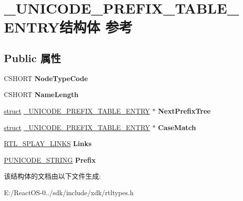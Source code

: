 \hypertarget{struct___u_n_i_c_o_d_e___p_r_e_f_i_x___t_a_b_l_e___e_n_t_r_y}{}\section{\+\_\+\+U\+N\+I\+C\+O\+D\+E\+\_\+\+P\+R\+E\+F\+I\+X\+\_\+\+T\+A\+B\+L\+E\+\_\+\+E\+N\+T\+R\+Y结构体 参考}
\label{struct___u_n_i_c_o_d_e___p_r_e_f_i_x___t_a_b_l_e___e_n_t_r_y}
\subsection*{Public 属性}
\begin{DoxyCompactItemize}
\item 
\mbox{\label{struct___u_n_i_c_o_d_e___p_r_e_f_i_x___t_a_b_l_e___e_n_t_r_y_aef9dc6897e15fdf522d035b4da75b87a}} 
C\+S\+H\+O\+RT {\bfseries Node\+Type\+Code}
\item 
\mbox{\label{struct___u_n_i_c_o_d_e___p_r_e_f_i_x___t_a_b_l_e___e_n_t_r_y_a8d2609fad02d784224161b183a04c645}} 
C\+S\+H\+O\+RT {\bfseries Name\+Length}
\item 
\mbox{\label{struct___u_n_i_c_o_d_e___p_r_e_f_i_x___t_a_b_l_e___e_n_t_r_y_a84e2cee2bf7b9b90da85844608087127}} 
\hyperlink{interfacestruct}{struct} \hyperlink{struct___u_n_i_c_o_d_e___p_r_e_f_i_x___t_a_b_l_e___e_n_t_r_y}{\+\_\+\+U\+N\+I\+C\+O\+D\+E\+\_\+\+P\+R\+E\+F\+I\+X\+\_\+\+T\+A\+B\+L\+E\+\_\+\+E\+N\+T\+RY} $\ast$ {\bfseries Next\+Prefix\+Tree}
\item 
\mbox{\label{struct___u_n_i_c_o_d_e___p_r_e_f_i_x___t_a_b_l_e___e_n_t_r_y_a58b03350e72529133349cafa313049c3}} 
\hyperlink{interfacestruct}{struct} \hyperlink{struct___u_n_i_c_o_d_e___p_r_e_f_i_x___t_a_b_l_e___e_n_t_r_y}{\+\_\+\+U\+N\+I\+C\+O\+D\+E\+\_\+\+P\+R\+E\+F\+I\+X\+\_\+\+T\+A\+B\+L\+E\+\_\+\+E\+N\+T\+RY} $\ast$ {\bfseries Case\+Match}
\item 
\mbox{\label{struct___u_n_i_c_o_d_e___p_r_e_f_i_x___t_a_b_l_e___e_n_t_r_y_a8da389991e7e1936b705381d574f7841}} 
\hyperlink{struct___r_t_l___s_p_l_a_y___l_i_n_k_s}{R\+T\+L\+\_\+\+S\+P\+L\+A\+Y\+\_\+\+L\+I\+N\+KS} {\bfseries Links}
\item 
\mbox{\label{struct___u_n_i_c_o_d_e___p_r_e_f_i_x___t_a_b_l_e___e_n_t_r_y_a6affd1f5f5c3b0290aad2d8c9fc95213}} 
\hyperlink{struct___u_n_i_c_o_d_e___s_t_r_i_n_g}{P\+U\+N\+I\+C\+O\+D\+E\+\_\+\+S\+T\+R\+I\+NG} {\bfseries Prefix}
\end{DoxyCompactItemize}


该结构体的文档由以下文件生成\+:\begin{DoxyCompactItemize}
\item 
E\+:/\+React\+O\+S-\/0../sdk/include/xdk/rtltypes.\+h\end{DoxyCompactItemize}

